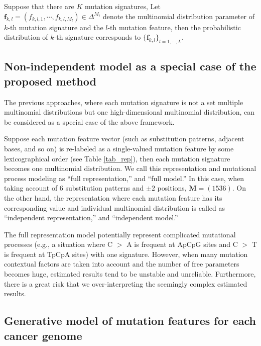 Suppose that there are $K$ mutation signatures,
Let  $\bm{f}_{k, l} = (f_{k, l, 1}, \cdots, f_{k, l, M_l }) \in \Delta^{M_l}$ denote 
the multinomial distribution parameter of $k$-th mutation signature and the $l$-th mutation feature, 
then the probabilistic distribution of $k$-th signature corresponds to $\{ \bm{f}_{k, l} \}_{l=1, \cdots, L}$.
 



\subsection*{Non-independent model as a special case of the proposed method}


The previous approaches, 
where each mutation signature is not a set multiple multinomial distributions but one high-dimensional multinomial distribution,
can be considered as a special case of the above framework.

Suppose each mutation feature vector (such as substitution patterns, adjacent bases, and so on) 
is re-labeled as a single-valued mutation feature by some lexicographical order (see Table \ref{tab_rep}),
then each mutation signature becomes one multinomial distribution. 
We call this representation and mutational process modeling as ``full representation,'' and ``full model.''
In this case, when taking account of 6 substitution patterns and $\pm 2$ positions,
$\bm{M} = (1536)$.
On the other hand, the representation where each mutation feature has its corresponding value and individual multinomial distribution
is called as ``independent representation,'' and ``independent model.''

The full representation model potentially represent complicated mutational processes
(e.g., a situation where C $>$ A is frequent at ApCpG sites and C $>$ T is frequent at TpCpA sites) with one signature.
However, when many mutation contextual factors are taken into account and the number of free parameters becomes huge,
estimated results tend to be unstable and unreliable.
Furthermore, there is a great risk that we over-interpreting the seemingly complex estimated results.


\subsection*{Generative model of mutation features for each cancer genome}

